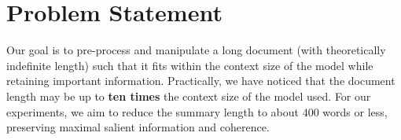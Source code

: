 \section{Problem Statement}
	\label{sec:problem}

	Our goal is to pre-process and manipulate a long document (with theoretically indefinite length)
	such that it fits within the context size of the model while retaining important information.
	Practically, we have noticed that the document length may be up to \textbf{ten times} the context
	size of the model used.
	For our experiments, we aim to reduce the summary length to about 400 words or less, preserving
	maximal salient information and coherence.
